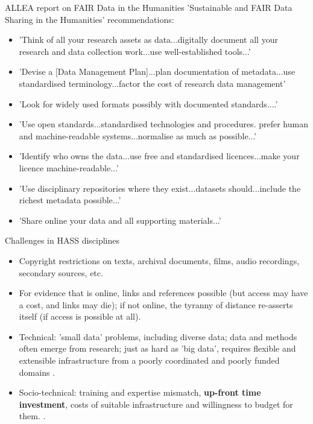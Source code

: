 \documentclass[aspectratio=169, 11pt]{beamer} %
\begin{document}
\begin{frame}{ALLEA report on FAIR Data in the Humanities }
  'Sustainable and FAIR Data Sharing in the Humanities' recommendations:
    \begin{itemize}[label=\textbullet]
        \item 'Think of all your research assets as data...digitally document all your research and data collection work...use well-established tools...'
        \item 'Devise a [Data Management Plan]...plan documentation of metadata...use standardised terminology...factor the cost of research data management'
        \item 'Look for widely used formats possibly with documented standards....'
        \item 'Use open standards...standardised technologies and procedures. prefer human and machine-readable systems...normalise as much as possible...'
        \item 'Identify who owns the data...use free and standardised licences...make your licence machine-readable...'
        \item 'Use disciplinary repositories where they exist...datasets should...include the richest metadata possible...'
        \item 'Share online your data and all supporting materials...'
    \end{itemize}
\end{frame}

\begin{frame}{Challenges in HASS disciplines}
      \begin{itemize}[label=\textbullet]
        \item Copyright restrictions on texts, archival documents, films, audio recordings, secondary sources, etc.
        \item For evidence that is online, links and references possible (but access may have a cost, and links may die); if not online, the tyranny of distance re-asserts itself (if access is possible at all). 
        \item Technical: 'small data' problems, including diverse data; data and methods often emerge from research; just as hard as 'big data', requires flexible and extensible infrastructure from a poorly coordinated and poorly funded domains \cite{Borgman2015-rh, Rda2019-wc}.
        \item Socio-technical: training and expertise mismatch, \textbf{up-front time investment}, costs of suitable infrastructure and willingness to budget for them.
        \cite{Mons2020-tb}.
    \end{itemize}
\end{frame}
\end{document}
